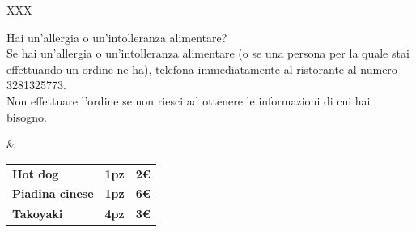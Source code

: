 \documentclass[hidelinks,10pt,a4paper]{article}
\newcommand{\mybox}[1]{
		\colorbox{square}{
		\begin{minipage}{0.97\linewidth}
			#1
		\end{minipage}
	}
}
\newcommand{\entryThreeSimple}[3]{
	{\textbf{\small{#1}}}&{\textbf{\small{#2}}}&{\textbf{\small{#3}}}\\
}
\begin{document}
\begin{landscape}
\begin{tabularx}{\linewidth}{XXX}
{				\vspace*{1mm}
				\colorbox{alert}{
				\begin{minipage}{0.97\linewidth}
					\raggedright {\huge\exclamationPoint} Hai un'allergia o un'intolleranza alimentare?\\ 
					Se hai un'allergia o un'intolleranza alimentare (o se una persona per la quale stai effettuando un ordine ne ha), telefona immediatamente al ristorante al numero 3281325773.\\ 
					Non effettuare l'ordine se non riesci ad ottenere le informazioni di cui hai bisogno.\\
					\vspace*{-0.5mm}
				\end{minipage}
			}
			
		}&{
				
				\vspace*{0.1cm}			
				\mybox{
				\begin{tabular*}{\linewidth}{ l l l }
				\entryThreeSimple{Hot dog}{\hspace*{30mm}1pz}{\hspace*{13mm}2€}
				\entryThreeSimple{Piadina cinese}{\hspace*{30mm}1pz}{\hspace*{13mm}6€}
				\entryThreeSimple{Takoyaki}{\hspace*{30mm}4pz}{\hspace*{13mm}3€}
				\end{tabular*}
			}
			
}
\end{tabularx}
\end{landscape}
\end{document}
